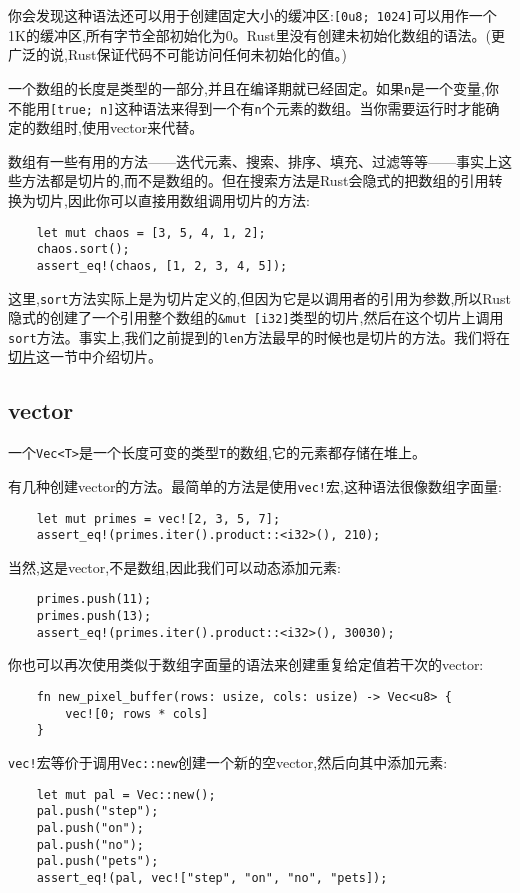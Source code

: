 你会发现这种语法还可以用于创建固定大小的缓冲区:\texttt{[0u8; 1024]}可以用作一个1K的缓冲区,所有字节全部初始化为0。Rust里没有创建未初始化数组的语法。(更广泛的说,Rust保证代码不可能访问任何未初始化的值。)

一个数组的长度是类型的一部分,并且在编译期就已经固定。如果\texttt{n}是一个变量,你不能用\texttt{[true; n]}这种语法来得到一个有\texttt{n}个元素的数组。当你需要运行时才能确定的数组时,使用vector来代替。

数组有一些有用的方法——迭代元素、搜索、排序、填充、过滤等等——事实上这些方法都是切片的,而不是数组的。但在搜索方法是Rust会隐式的把数组的引用转换为切片,因此你可以直接用数组调用切片的方法:
\begin{verbatim}
    let mut chaos = [3, 5, 4, 1, 2];
    chaos.sort();
    assert_eq!(chaos, [1, 2, 3, 4, 5]);
\end{verbatim}

这里,\texttt{sort}方法实际上是为切片定义的,但因为它是以调用者的引用为参数,所以Rust隐式的创建了一个引用整个数组的\texttt{\&mut [i32]}类型的切片,然后在这个切片上调用\texttt{sort}方法。事实上,我们之前提到的\texttt{len}方法最早的时候也是切片的方法。我们将在\hyperref[slice]{切片}这一节中介绍切片。

\subsection{vector}\label{vector}

一个\texttt{Vec<T>}是一个长度可变的类型\texttt{T}的数组,它的元素都存储在堆上。

有几种创建vector的方法。最简单的方法是使用\texttt{vec!}宏,这种语法很像数组字面量:
\begin{verbatim}
    let mut primes = vec![2, 3, 5, 7];
    assert_eq!(primes.iter().product::<i32>(), 210);
\end{verbatim}
当然,这是vector,不是数组,因此我们可以动态添加元素:
\begin{verbatim}
    primes.push(11);
    primes.push(13);
    assert_eq!(primes.iter().product::<i32>(), 30030);
\end{verbatim}

你也可以再次使用类似于数组字面量的语法来创建重复给定值若干次的vector:
\begin{verbatim}
    fn new_pixel_buffer(rows: usize, cols: usize) -> Vec<u8> {
        vec![0; rows * cols]
    }
\end{verbatim}
\texttt{vec!}宏等价于调用\texttt{Vec::new}创建一个新的空vector,然后向其中添加元素:
\begin{verbatim}
    let mut pal = Vec::new();
    pal.push("step");
    pal.push("on");
    pal.push("no");
    pal.push("pets");
    assert_eq!(pal, vec!["step", "on", "no", "pets]);
\end{verbatim}

